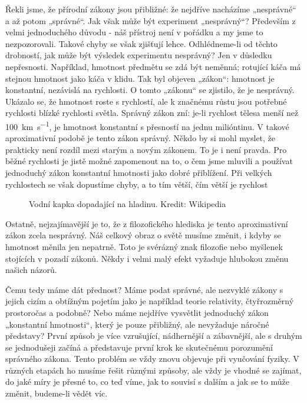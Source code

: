     Řekli jsme, že přírodní zákony jsou přibližné: že nejdříve nacházíme „nesprávné“ a až potom
    „správné“. Jak však může být experiment „nesprávný“? Především z velmi jednoduchého důvodu - náš
    přístroj není v pořádku a my jsme to nezpozorovali. Takové chyby se však zjišťují lehce.
    Odhlédneme-li od těchto drobností, jak může být výsledek experimentu nesprávný? Jen v důsledku
    nepřesnosti. Například, hmotnost předmětu se zdá být neměnná; rotující káča má stejnou hmotnost
    jako káča v klidu. Tak byl objeven „zákon“: hmotnost je konstantní, nezávislá na rychlosti. O
    tomto „zákonu“ se zjistilo, že je nesprávný. Ukázalo se, že hmotnost roste s rychlostí, ale k
    značnému růstu jsou potřebné rychlosti blízké rychlosti světla. Správný zákon zní: je-li
    rychlost tělesa menší než \qty{100}{\km\per\second}, je hmotnost konstantní s přesností na jednu
    milióntinu. V takové aproximativní podobě je tento zákon správný. Někdo by si mohl myslet, že
    prakticky není rozdíl mezi starým a novým zákonem. To je i není pravda. Pro běžné rychlosti je
    jistě možné zapomenout na to, o čem jsme mluvili a používat jednoduchý zákon konstantní
    hmotnosti jako dobré přiblížení. Při velkých rychlostech se však dopustíme chyby, a to tím
    větší, čím větší je rychlost

    \begin{figure}[ht!]  %
      \centering
      \caption{Vodní kapka dopadající na hladinu. Kredit: Wikipedia}
      \label{fyz:fig0891}
    \end{figure} 
    
    Ostatně, nejzajímavější je to, že z filozofického hlediska je tento aproximativní zákon zcela
    nesprávný. Náš celkový obraz o světě musíme změnit, i kdyby se hmotnost měnila jen nepatrně.
    Toto je svérázný znak filozofie nebo myšlenek stojících v pozadí zákonů. Někdy i velmi malý
    efekt vyžaduje hlubokou změnu našich názorů.
    
    Čemu tedy máme dát přednost? Máme podat správné, ale nezvyklé zákony s jejich cizím a obtížným
    pojetím jako je například teorie relativity, čtyřrozměrný prostoročas a podobně? Nebo máme
    nejdříve vysvětlit jednoduchý zákon „konstantní hmotnosti“, který je pouze přibližný, ale
    nevyžaduje náročné představy? První způsob je více vzrušující, nádhernější a zábavnější, ale s
    druhým se jednodušeji začíná a představuje první krok ke skutečnému porozumění správného zákona.
    Tento problém se vždy znovu objevuje při vyučování fyziky. V různých etapách ho musíme řešit
    různými způsoby, ale vždy je vhodné se zajímat, do jaké míry je přesné to, co teď víme, jak to
    souvisí s dalším a jak se to může změnit, budeme-li vědět víc.
    
